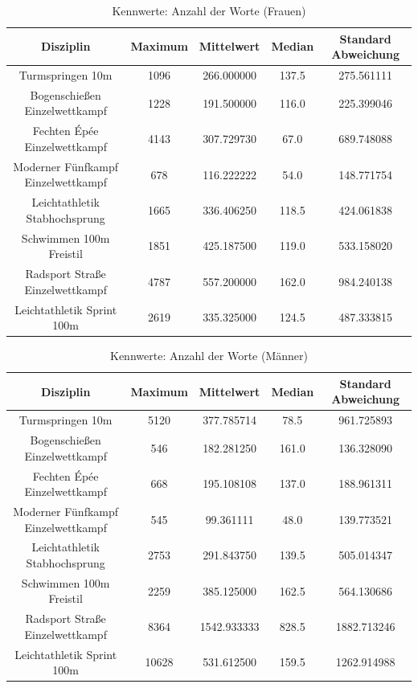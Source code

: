 \documentclass[11pt]{article}
\begin{document}
\begin{table}
\centering
\begin{tabular}{ c|c|c|c|c }
  Disziplin & Maximum & Mittelwert & Median & Standard Abweichung \\
  \hline
  Turmspringen 10m & 1096 & 266.000000 & 137.5 & 275.561111\\
  Bogenschießen Einzelwettkampf & 1228 & 191.500000 & 116.0 & 225.399046\\
  Fechten Épée Einzelwettkampf & 4143& 307.729730 & 67.0 & 689.748088\\
  Moderner Fünfkampf Einzelwettkampf & 678& 116.222222 & 54.0& 148.771754\\
  Leichtathletik Stabhochsprung & 1665 & 336.406250 & 118.5 & 424.061838\\
  Schwimmen 100m Freistil & 1851 & 425.187500 & 119.0 & 533.158020\\
  Radsport Straße Einzelwettkampf & 4787& 557.200000 & 162.0 & 984.240138\\
  Leichtathletik Sprint 100m & 2619& 335.325000 & 124.5& 487.333815\\
\end{tabular}
\caption{\label{tab:wordcount_kpi_women}Kennwerte: Anzahl der Worte (Frauen)}
\end{table}

\begin{table}
\centering
\begin{tabular}{ c|c|c|c|c }
  Disziplin & Maximum & Mittelwert & Median & Standard Abweichung \\
  \hline
  Turmspringen 10m & 5120 & 377.785714 & 78.5 & 961.725893\\
  Bogenschießen Einzelwettkampf & 546 & 182.281250 & 161.0 & 136.328090\\
  Fechten Épée Einzelwettkampf & 668 & 195.108108 & 137.0 & 188.961311\\
  Moderner Fünfkampf Einzelwettkampf & 545 & 99.361111 & 48.0 & 139.773521\\
  Leichtathletik Stabhochsprung & 2753 & 291.843750 & 139.5 & 505.014347\\
  Schwimmen 100m Freistil & 2259 & 385.125000 & 162.5 & 564.130686\\
  Radsport Straße Einzelwettkampf & 8364 & 1542.933333 & 828.5 & 1882.713246\\
  Leichtathletik Sprint 100m & 10628 & 531.612500 & 159.5 & 1262.914988\\
\end{tabular}
\caption{\label{tab:wordcount_kpi_men}Kennwerte: Anzahl der Worte (Männer)}
\end{table}
\end{document}

